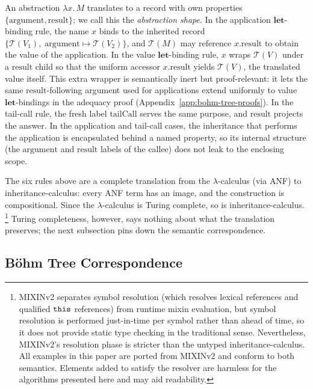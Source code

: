 An abstraction $\lambda x.\, M$ translates to a record with own
properties $\{\mathrm{argument}, \mathrm{result}\}$; we call this
the \emph{abstraction shape}.
In the application $\mathbf{let}$-binding rule, the name $x$
binds to the inherited record
$\{\mathcal{T}(V_1),\;\mathrm{argument} \mapsto \mathcal{T}(V_2)\}$,
and $\mathcal{T}(M)$ may reference $x.\mathrm{result}$ to obtain
the value of the application.
In the value $\mathbf{let}$-binding rule, $x$ wraps $\mathcal{T}(V)$
under a $\mathrm{result}$ child so that the uniform accessor
$x.\mathrm{result}$ yields $\mathcal{T}(V)$, the translated value
itself.
This extra wrapper is semantically inert but proof-relevant:
it lets the same $\mathrm{result}$-following argument used for
applications extend uniformly to value
$\mathbf{let}$-bindings in the adequacy proof
(Appendix~\ref{app:bohm-tree-proofs}).
In the tail-call rule, the fresh label $\mathrm{tailCall}$ serves
the same purpose, and $\mathrm{result}$ projects the answer.
In the application and tail-call cases, the inheritance that
performs the application is
encapsulated behind a named property, so its internal
structure (the $\mathrm{argument}$ and $\mathrm{result}$ labels
of the callee) does not leak to the enclosing scope.

The six rules above are a complete translation from the
$\lambda$-calculus (via ANF) to inheritance-calculus: every ANF
term has an image, and the construction is compositional.
Since the $\lambda$-calculus is Turing complete, so is
inheritance-calculus.%
\footnote{
  MIXINv2 separates symbol resolution (which resolves
  lexical references and qualified $\mathtt{this}$ references) from runtime
  mixin evaluation, but symbol resolution is performed
  just-in-time per symbol rather than ahead of time, so it does
  not provide static type checking in the traditional sense.
  Nevertheless, MIXINv2's resolution phase is stricter than the
  untyped inheritance-calculus.
  All examples in this paper are ported from MIXINv2
  and conform to both semantics.
  Elements added to satisfy the resolver are harmless
  for the algorithms presented here and may aid readability.
}
Turing completeness, however, says nothing about what the
translation preserves; the next subsection pins down
the semantic correspondence.

\subsection{B\"ohm Tree Correspondence}
\label{sec:bohm-tree}

